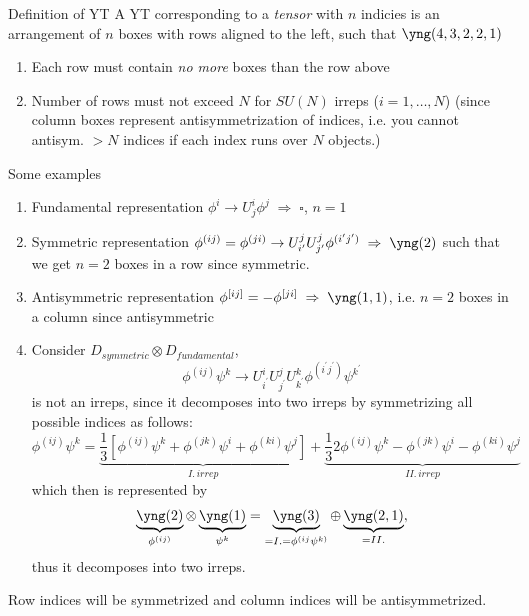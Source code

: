 \begin{mybox}{Definition of YT }
	A YT corresponding to a \emph{tensor} with $n$ indicies is an arrangement of $n$ boxes with rows aligned to the left, such that
$\yng(4,3,2,2,1)$
\begin{enumerate}	
	\item Each row must contain  \emph{no more} boxes than the row above
	\item Number of rows must not exceed $N$ for $SU(N)$ irreps ($i=1,\dots,N$) (since column boxes represent antisymmetrization of indices, i.e. you cannot antisym. $>N$ indices if each index runs over $N$ objects.)
\end{enumerate}
\end{mybox}
Some examples
\begin{enumerate}
	\item Fundamental representation $\phi^i \rightarrow U^i_j \phi^j \; \Rightarrow \; \square$, $n=1$
	\item Symmetric representation $\phi^{(ij)} = \phi^{(ji)} \rightarrow U^j_{i^\prime} U^j_{j^\prime} \phi^{(i^\prime j^\prime)} \; \Rightarrow \; \yng(2)$ such that we get $n=2$ boxes in a row since symmetric.
	\item Antisymmetric representation $\phi^{[ij]}=-\phi^{[ji]}\;\Rightarrow\; \yng(1,1)$, i.e. $n=2$ boxes in a column since antisymmetric
	\item Consider $D_{symmetric}\otimes D_{fundamental}$,
\begin{equation}
	\phi^{(ij)} \psi^k \rightarrow U^i_{i^\prime} U^j_{j^\prime} U^k_{k^\prime} \phi^{(i^\prime j^\prime)} \psi^{k^\prime}
\end{equation}
is not an irreps, since it decomposes into two irreps by symmetrizing all possible indices as follows:
\begin{equation}
\label{eq:exampleYT1}
	\phi^{(ij)} \psi^k =\underbrace{ \frac{1}{3} \left[\phi^{(ij)} \psi^k + \phi^(jk) \psi^i + \phi^{(ki)} \psi^j\right]}_{I.\, irrep} + \underbrace{\frac{1}{3} 2 \phi^{(ij)} \psi^k - \phi^{(jk)} \psi^i - \phi^{(ki)} \psi^j}_{II.\, irrep}
\end{equation}
which then is represented by
\begin{equation}
\underbrace{\yng(2)}_{\phi^{(ij)}} \otimes \underbrace{\yng(1)}_{\psi^k} = \underbrace{\yng(3)}_{=I.=\phi^{(ij} \psi^{k)}} \oplus \underbrace{\yng(2,1)}_{=II.},
\end{equation}
thus it decomposes into two irreps.
\end{enumerate}
\begin{mybox}{}
	Row indices will be symmetrized and column indices will be antisymmetrized.
\end{mybox}
